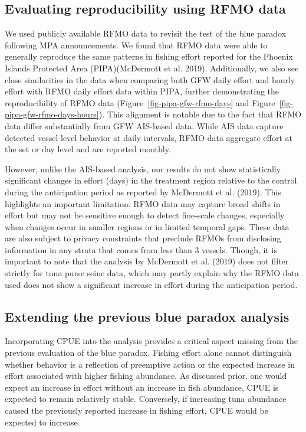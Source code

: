 \documentclass[
  letterpaper,
  DIV=11,
  numbers=noendperiod]{scrartcl}
\begin{document}
\subsection{Evaluating reproducibility using RFMO
data}\label{evaluating-reproducibility-using-rfmo-data}

We used publicly available RFMO data to revisit the test of the blue
paradox following MPA announcements. We found that RFMO data were able
to generally reproduce the same patterns in fishing effort reported for
the Phoenix Islands Protected Area (PIPA)(McDermott et al. 2019).
Additionally, we also see close similarities in the data when comparing
both GFW daily effort and hourly effort with RFMO daily effort data
within PIPA, further demonstrating the reproducibility of RFMO data
(Figure~\ref{fig-pipa-gfw-rfmo-days} and
Figure~\ref{fig-pipa-gfw-rfmo-days-hours}). This alignment is notable
due to the fact that RFMO data differ substantially from GFW AIS-based
data. While AIS data capture detected vessel-level behavior at daily
intervals, RFMO data aggregate effort at the set or day level and are
reported monthly.

However, unlike the AIS-based analysis, our results do not show
statistically significant changes in effort (days) in the treatment
region relative to the control during the anticipation period as
reported by McDermott et al. (2019). This highlights an important
limitation. RFMO data may capture broad shifts in effort but may not be
sensitive enough to detect fine-scale changes, especially when changes
occur in smaller regions or in limited temporal gaps. These data are
also subject to privacy constraints that preclude RFMOs from disclosing
information in any strata that comes from less than 3 vessels. Though,
it is important to note that the analysis by McDermott et al. (2019)
does not filter strictly for tuna purse seine data, which may partly
explain why the RFMO data used does not show a significant increase in
effort during the anticipation period.

\subsection{Extending the previous blue paradox
analysis}\label{extending-the-previous-blue-paradox-analysis}

Incorporating CPUE into the analysis provides a critical aspect missing
from the previous evaluation of the blue paradox. Fishing effort alone
cannot distinguish whether behavior is a reflection of preemptive action
or the expected increase in effort associated with higher fishing
abundance. As discussed prior, one would expect an increase in effort
without an increase in fish abundance, CPUE is expected to remain
relatively stable. Conversely, if increasing tuna abundance caused the
previously reported increase in fishing effort, CPUE would be expected
to increase.
\end{document}

